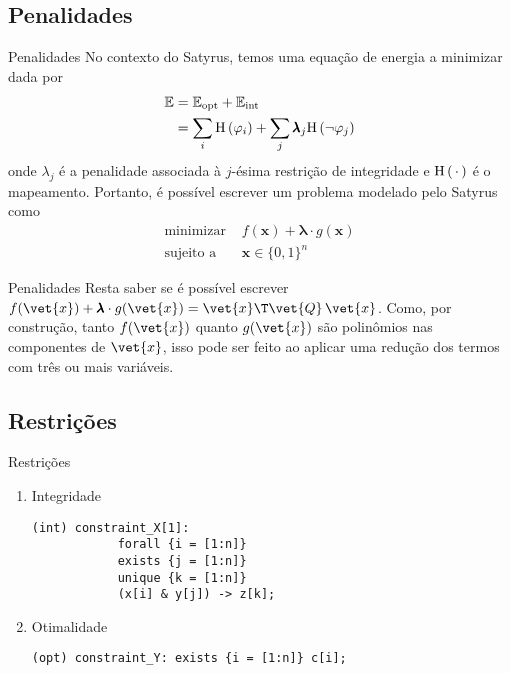 \documentclass[brazil, MathSerif, aspectratio = 169]{beamer}
\begin{document}
    \subsection{Penalidades}
    \begin{frame}{Penalidades}
        No contexto do Satyrus, temos uma equação de energia a minimizar dada por
            \begin{align*}
                \mathbb{E} &= \mathbb{E}_\text{opt} + \mathbb{E}_\text{int}\\
                        &= \sum_{i} \HH{\varphi_i} %
                        + \sum_j \pmb{\lambda}_j \HH{\neg \varphi_j}
            \end{align*}
        onde $\lambda_j$ é a penalidade associada à $j$-ésima restrição de integridade e $\text{H}\left(\,\cdot\,\right)$ é o mapeamento. Portanto, é possível escrever um problema modelado pelo Satyrus como
            \begin{align*}
                \text{minimizar } &f(\mathbf{x}) + \pmb{\lambda} \cdot g(\mathbf{x})\\
                \text{sujeito a } &\mathbf{x} \in \{0, 1\}^{n}
            \end{align*}
    \end{frame}


    \begin{frame}{Penalidades}%
        Resta saber se é possível escrever
            $f(\vet{x}) + \pmb{\lambda} \cdot g(\vet{x}) = \vet{x}\T \vet{Q}\, \vet{x}$.
        Como, por construção, tanto $f(\vet{x})$ quanto $g(\vet{x})$ são polinômios nas componentes de $\vet{x}$, isso pode ser feito ao aplicar uma redução dos termos com três ou mais variáveis.
    \end{frame}

    \subsection{Restrições}
    \begin{frame}[fragile]{Restrições}%
        \begin{enumerate}
            \item Integridade
        \begin{lstlisting}[style=SATStyle, gobble=8]
        (int) constraint_X[1]:
            forall {i = [1:n]}
            exists {j = [1:n]}
            unique {k = [1:n]}
            (x[i] & y[j]) -> z[k];
        \end{lstlisting}
            \item Otimalidade
        \begin{lstlisting}[style=SATStyle, gobble=8]
        (opt) constraint_Y: exists {i = [1:n]} c[i];
        \end{lstlisting}
        \end{enumerate}
        
    \end{frame}
\end{document}
